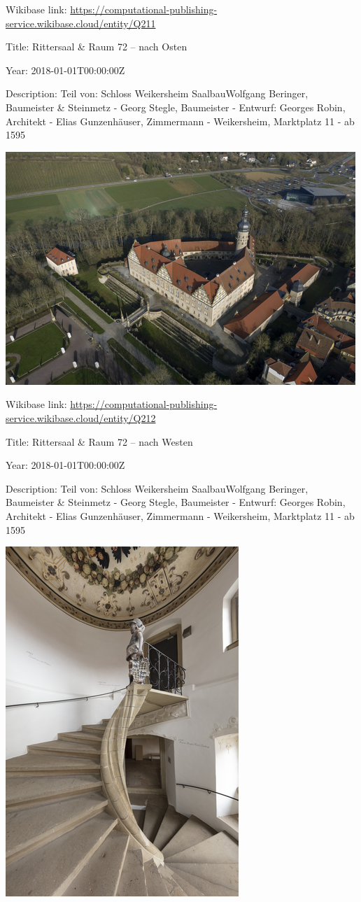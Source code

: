 \documentclass[
  letterpaper,
]{book}
\begin{document}
Wikibase link:
\url{https://computational-publishing-service.wikibase.cloud/entity/Q211}

Title: Rittersaal \& Raum 72 -- nach Osten

Year: 2018-01-01T00:00:00Z

Description: Teil von: Schloss Weikersheim SaalbauWolfgang Beringer,
Baumeister \& Steinmetz - Georg Stegle, Baumeister - Entwurf: Georges
Robin, Architekt - Elias Gunzenhäuser, Zimmermann - Weikersheim,
Marktplatz 11 - ab 1595

\includegraphics{paintings_files/figure-pdf/cell-3-output-14.png}

Wikibase link:
\url{https://computational-publishing-service.wikibase.cloud/entity/Q212}

Title: Rittersaal \& Raum 72 -- nach Westen

Year: 2018-01-01T00:00:00Z

Description: Teil von: Schloss Weikersheim SaalbauWolfgang Beringer,
Baumeister \& Steinmetz - Georg Stegle, Baumeister - Entwurf: Georges
Robin, Architekt - Elias Gunzenhäuser, Zimmermann - Weikersheim,
Marktplatz 11 - ab 1595

\includegraphics{paintings_files/figure-pdf/cell-3-output-16.png}
\end{document}
